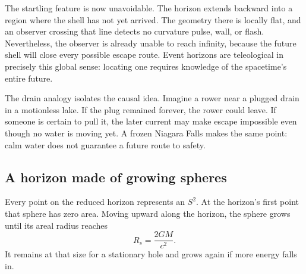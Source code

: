 The startling feature is now unavoidable. The horizon extends backward into a region where the shell has not yet arrived. The geometry there is locally flat, and an observer crossing that line detects no curvature pulse, wall, or flash. Nevertheless, the observer is already unable to reach infinity, because the future shell will close every possible escape route. Event horizons are teleological in precisely this global sense: locating one requires knowledge of the spacetime's entire future.

The drain analogy isolates the causal idea. Imagine a rower near a plugged drain in a motionless lake. If the plug remained forever, the rower could leave. If someone is certain to pull it, the later current may make escape impossible even though no water is moving yet. A frozen Niagara Falls makes the same point: calm water does not guarantee a future route to safety.

\begin{classroomqa}
\end{classroomqa}

\subsection{A horizon made of growing spheres}

Every point on the reduced horizon represents an \(S^2\). At the horizon's first point that sphere has zero area. Moving upward along the horizon, the sphere grows until its areal radius reaches
\begin{equation}
R_s=\frac{2GM}{c^2}.
\end{equation}
It remains at that size for a stationary hole and grows again if more energy falls in.


